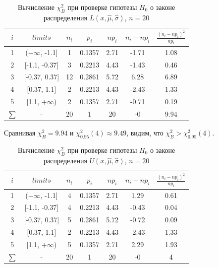 \documentclass[main.tex]{subfiles}
\begin{document}
\begin{table}[ht]
	\centering
	\begin{tabular}{| c | c | c | c | c | c | c |}
		\hline
		$i$ & $limits$         &   $n_i$ &    $p_i$ &   $np_i$ &   $n_i - np_i$ &   $\frac{(n_i-np_i)^2}{np_i}$ \\
		\hline
		1 & ($-\infty$, -1.1] &     1 & 0.1357 &   2.71 &        -1.71 &                        1.08 \\
		2 & [-1.1, -0.37]  &     3 & 0.2213 &   4.43 &        -1.43 &                        0.46 \\
		3 & [-0.37, 0.37]  &    12 & 0.2861 &   5.72 &         6.28 &                        6.89 \\
		4 & [0.37, 1.1]    &     2 & 0.2213 &   4.43 &        -2.43 &                        1.33 \\
		5 & [1.1, $+\infty$)   &     2 & 0.1357 &   2.71 &        -0.71 &                        0.19 \\
		$\sum$ & -              &    20 & 1      &  20    &        -0    &                        9.94 \\
		\hline
	\end{tabular}
	\caption{ Вычисление $\chi^{2}_{B}$ при проверке гипотезы $H_{0}$ о законе распределения $L(x,\hat{\mu}, \hat{\sigma})$, $n=20$}
	\label{tab:laplace_chi_2}
\end{table}
\noindent Сравнивая $\chi^{2}_{B} = 9.94$ и $\chi^{2}_{0.95}(4) \approx 9.49$, видим, что $\chi^{2}_{B} > \chi^{2}_{0.95}(4)$.

\begin{table}[ht]
	\centering
	\begin{tabular}{| c | c | c | c | c | c | c |}
		\hline
		$i$ & $limits$         &   $n_i$ &    $p_i$ &   $np_i$ &   $n_i - np_i$ &   $\frac{(n_i-np_i)^2}{np_i}$ \\
		\hline
		1 & ($-\infty$, -1.1] &     4 & 0.1357 &   2.71 &         1.29 &                        0.61 \\
		2 & [-1.1, -0.37]  &     4 & 0.2213 &   4.43 &        -0.43 &                        0.04 \\
		3 & [-0.37, 0.37]  &     5 & 0.2861 &   5.72 &        -0.72 &                        0.09 \\
		4 & [0.37, 1.1]    &     2 & 0.2213 &   4.43 &        -2.43 &                        1.33 \\
		5 & [1.1, $+\infty$)   &     5 & 0.1357 &   2.71 &         2.29 &                        1.93 \\
		$\sum$ & -              &    20 & 1      &  20    &        -0    &                        4    \\
		\hline
	\end{tabular}
	\caption{ Вычисление $\chi^{2}_{B}$ при проверке гипотезы $H_{0}$ о законе распределения $U(x,\hat{\mu}, \hat{\sigma})$, $n=20$}
	\label{tab:uniform_chi_2}
\end{table}
\end{document}

